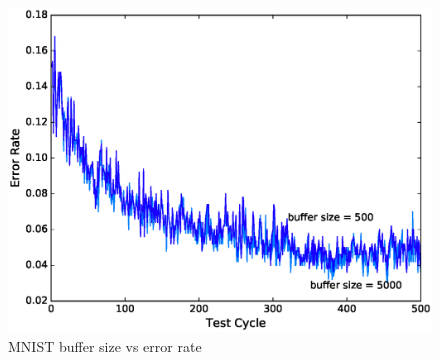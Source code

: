 \documentclass{sig-alternate-05-2015}
\begin{document}
\begin{figure}[!ht]
\centering
\includegraphics[width=\columnwidth]{../images/experiment-results/mnist-buffer-size}
\caption{MNIST buffer size vs error rate}
\label{fig:mnist-buffer-size}
\end{figure}
\end{document}
